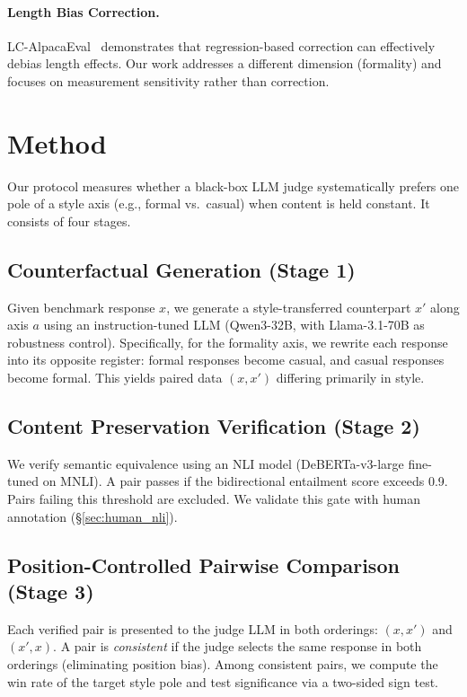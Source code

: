 \documentclass[11pt,a4paper]{article}
\begin{document}
\paragraph{Length Bias Correction.}
LC-AlpacaEval~\cite{li2024alpacaeval} demonstrates that regression-based correction can effectively debias length effects.
Our work addresses a different dimension (formality) and focuses on measurement sensitivity rather than correction.

\section{Method}

Our protocol measures whether a black-box LLM judge systematically prefers one pole of a style axis (e.g., formal vs.\ casual) when content is held constant.
It consists of four stages.

\subsection{Counterfactual Generation (Stage 1)}

Given benchmark response $x$, we generate a style-transferred counterpart $x'$ along axis $a$ using an instruction-tuned LLM (Qwen3-32B, with Llama-3.1-70B as robustness control).
Specifically, for the formality axis, we rewrite each response into its opposite register: formal responses become casual, and casual responses become formal.
This yields paired data $(x, x')$ differing primarily in style.

\subsection{Content Preservation Verification (Stage 2)}

We verify semantic equivalence using an NLI model (DeBERTa-v3-large fine-tuned on MNLI).
A pair passes if the bidirectional entailment score exceeds 0.9.
Pairs failing this threshold are excluded.
We validate this gate with human annotation (\S\ref{sec:human_nli}).

\subsection{Position-Controlled Pairwise Comparison (Stage 3)}

Each verified pair is presented to the judge LLM in both orderings: $(x, x')$ and $(x', x)$.
A pair is \textit{consistent} if the judge selects the same response in both orderings (eliminating position bias).
Among consistent pairs, we compute the win rate of the target style pole and test significance via a two-sided sign test.
\end{document}
